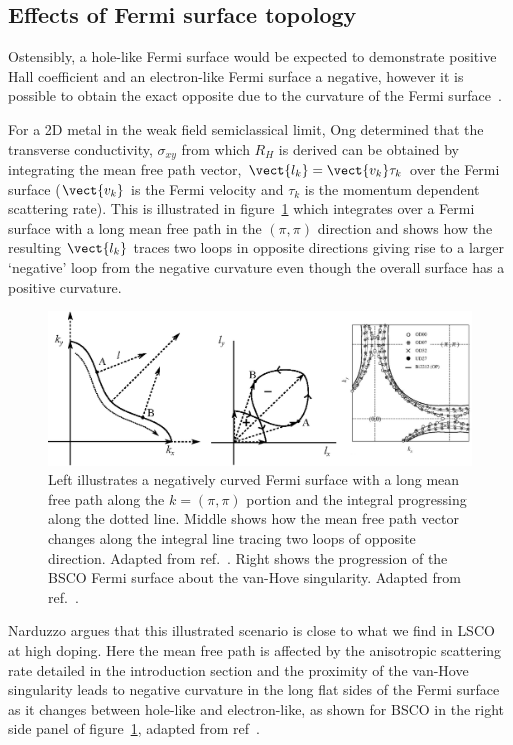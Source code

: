 \subsection{Effects of Fermi surface topology}
    \label{Sec:Theo:TopologyEffects}

Ostensibly, a hole-like Fermi surface would be expected to demonstrate positive Hall coefficient and an electron-like Fermi surface a negative, however it is possible to obtain the exact opposite due to the curvature of the Fermi surface~\cite{Narduzzo2008}. 

For a 2D metal in the weak field semiclassical limit, Ong determined that the transverse conductivity, $\sigma_{xy}$ from which $R_H$ is derived can be obtained by integrating the mean free path vector, $\vect{l_k} = \vect{v_k}\tau_k$ over the Fermi surface ($\vect{v_k}$ is the Fermi velocity and $\tau_k$ is the momentum dependent scattering rate). This is illustrated in figure~\ref{Fig:Theo:NegativeCurvatureLSCO} which integrates over a Fermi surface with a long mean free path in the $(\pi, \pi)$ direction and shows how the resulting $\vect{l_k}$ traces two loops in opposite directions giving rise to a larger `negative' loop from the negative curvature even though the overall surface has a positive curvature.
\begin{figure}[htbp]
    \begin{center}
        \includegraphics[scale=0.9]{Chapter-Theory/Figures/NegativeCurvatureLSCO/NegativeCurvatureLSCO}
        \caption{Left illustrates a negatively curved Fermi surface with a long mean free path along the $k = (\pi, \pi)$ portion and the integral progressing along the dotted line. Middle shows how the mean free path vector changes along the integral line tracing two loops of opposite direction. Adapted from ref.~\cite{Narduzzo2008}. Right shows the progression of the \ac{BSCO} Fermi surface about the van-Hove singularity. Adapted from ref.~\cite{Kondo2004}.}
        \label{Fig:Theo:NegativeCurvatureLSCO}
    \end{center}
\end{figure}
Narduzzo \etal argues that this illustrated scenario is close to what we find in \ac{LSCO} at high doping. Here the mean free path is affected by the anisotropic scattering rate detailed in the introduction section and the proximity of the van-Hove singularity leads to negative curvature in the long flat sides of the Fermi surface as it changes between hole-like and electron-like, as shown for \ac{BSCO} in the right side panel of figure~\ref{Fig:Theo:NegativeCurvatureLSCO}, adapted from ref~\cite{Kondo2004}.

